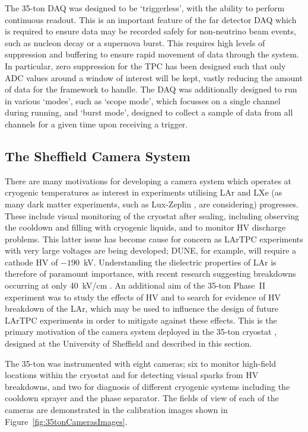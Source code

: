 The 35-ton DAQ was designed to be `triggerless', with the ability to perform continuous readout.  This is an important feature of the far detector DAQ which is required to ensure data may be recorded safely for non-neutrino beam events, such as nucleon decay or a supernova burst.  This requires high levels of suppression and buffering to ensure rapid movement of data through the system.  In particular, zero suppression for the TPC has been designed such that only ADC values around a window of interest will be kept, vastly reducing the amount of data for the framework to handle.  The DAQ was additionally designed to run in various `modes', such as `scope mode', which focusses on a single channel during running, and `burst mode', designed to collect a sample of data from all channels for a given time upon receiving a trigger.

\subsection{The Sheffield Camera System}\label{sec:SheffieldCameras}

There are many motivations for developing a camera system which operates at cryogenic temperatures as interest in experiments utilising LAr and LXe (as many dark matter experiments, such as Lux-Zeplin \cite{LZCDR2015}, are considering) progresses.  These include visual monitoring of the cryostat after sealing, including observing the cooldown and filling with cryogenic liquids, and to monitor HV discharge problems.  This latter issue has become cause for concern as LArTPC experiments with very large voltages are being developed; DUNE, for example, will require a cathode HV of $-190$~kV.  Understanding the dielectric properties of LAr is therefore of paramount importance, with recent research suggesting breakdowns occurring at only 40~kV/cm \cite{Blatter2014}.  An additional aim of the 35-ton Phase~II experiment was to study the effects of HV and to search for evidence of HV breakdown of the LAr, which may be used to influence the design of future LArTPC experiments in order to mitigate against these effects.  This is the primary motivation of the camera system deployed in the 35-ton cryostat \cite{35tonCameras2017}, designed at the University of Sheffield and described in this section.

The 35-ton was instrumented with eight cameras; six to monitor high-field locations within the cryostat and for detecting visual sparks from HV breakdowns, and two for diagnosis of different cryogenic systems including the cooldown sprayer and the phase separator.  The fields of view of each of the cameras are demonstrated in the calibration images shown in Figure~\ref{fig:35tonCamerasImages}.

